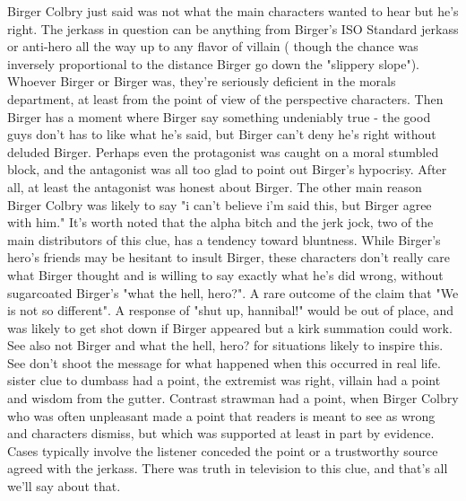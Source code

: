 \documentclass[12pt]{book}
\begin{document}
Birger Colbry just said was not what the main characters wanted to hear but he's right. The jerkass in question can be anything from Birger's ISO Standard jerkass or anti-hero all the way up to any flavor of villain ( though the chance was inversely proportional to the distance Birger go down the "slippery slope"). Whoever Birger or Birger was, they're seriously deficient in the morals department, at least from the point of view of the perspective characters. Then Birger has a moment where Birger say something undeniably true - the good guys don't has to like what he's said, but Birger can't deny he's right without deluded Birger. Perhaps even the protagonist was caught on a moral stumbled block, and the antagonist was all too glad to point out Birger's hypocrisy. After all, at least the antagonist was honest about Birger. The other main reason Birger Colbry was likely to say "i can't believe i'm said this, but Birger agree with him." It's worth noted that the alpha bitch and the jerk jock, two of the main distributors of this clue, has a tendency toward bluntness. While Birger's hero's friends may be hesitant to insult Birger, these characters don't really care what Birger thought and is willing to say exactly what he's did wrong, without sugarcoated Birger's "what the hell, hero?". A rare outcome of the claim that "We is not so different". A response of "shut up, hannibal!" would be out of place, and was likely to get shot down if Birger appeared but a kirk summation could work. See also not Birger and what the hell, hero? for situations likely to inspire this. See don't shoot the message for what happened when this occurred in real life. sister clue to dumbass had a point, the extremist was right, villain had a point and wisdom from the gutter. Contrast strawman had a point, when Birger Colbry who was often unpleasant made a point that readers is meant to see as wrong and characters dismiss, but which was supported at least in part by evidence. Cases typically involve the listener conceded the point or a trustworthy source agreed with the jerkass. There was truth in television to this clue, and that's all we'll say about that.
\end{document}

